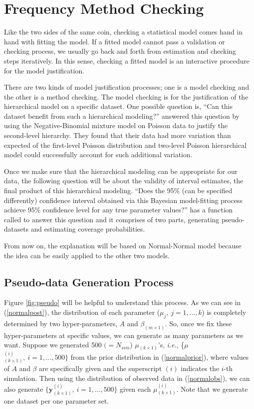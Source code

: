 \documentclass[article]{jss}
\begin{document}
\section[Frequency Method Checking]{Frequency Method Checking}
Like the two sides of the same coin, checking a statistical model comes hand in hand with fitting the model. If a fitted model cannot pass a validation or checking process, we usually go back and forth from estimation and checking steps iteratively. In this sense, checking a fitted model is an interactive procedure for the model justification.


There are two kinds of model justification processes; one is a model checking and the other is a method checking. The model checking is for the justification of the hierarchical model on a specific dataset. One possible question is, ``Can this dataset benefit from such a hierarchical modeling?'' \cite{modelchecking1996} answered this question by using the Negative-Binomial mixture model on Poisson data to justify the second-level hierarchy. They found that their data had more variation than expected of the first-level Poisson distribution and two-level Poisson hierarchical model could successfully account for such additional variation.


Once we make sure that the hierarchical modeling can be appropriate for our data, the following question will be about the validity of interval estimates, the final product of this hierarchical modeling. ``Does the 95\% (can be specified differently) confidence interval obtained via this Bayesian model-fitting process achieve 95\% confidence level  for any true parameter values?''  has a function called  to answer this question and it comprises of two parts, generating pseudo-datasets and estimating coverage probabilities.

From now on, the explanation will be based on Normal-Normal model because the idea can be easily applied to the other two models.

\subsection{Pseudo-data Generation Process}
Figure \ref{fig:pseudo} will be helpful to understand this process. As we can see in (\ref{normalpost}), the distribution of each parameter ($\mu_{j},~j=1,\ldots, k$) is completely determined by two hyper-parameters, $A$ and $\beta_{(m\times1)}$. So, once we fix these hyper-parameters at specific values, we can generate as many parameters as we want. Suppose we generated 500 $(=N_{sim}$) {\boldmath $\mu$}$_{(k\times1)}$'s, \emph{i.e.}, \{{\boldmath $\mu$}$^{(i)}_{(k\times1)},~i=1, \ldots, 500\}$ from the prior distribution in (\ref{normalprior}), where values of $A$ and $\beta$ are specifically given and the superscript $(i)$ indicates the $i$-th simulation. Then using the distribution of observed data in (\ref{normalobs}), we can also generate $\{\mathbf{y}^{(i)}_{(k\times1)},~i=1, \ldots, 500\}$ given each {\boldmath$\mu$}$^{(i)}_{(k\times1)}$. Note that we generate one dataset per one parameter set.
\end{document}
